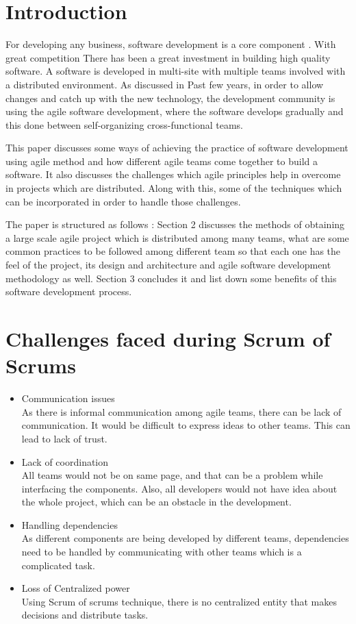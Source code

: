 \documentclass[sigconf]{acmart}
\begin{document}
\section{Introduction}
For developing any business, software development is a core component \cite{HenrikK}. With great competition There has been a great investment in building high quality software. A software is developed in multi-site with multiple teams involved with a distributed environment. As discussed in \cite{4638656}Past few years, in order to allow changes and catch up with the new technology, the development community is using the agile software development, where the software develops gradually and this done between self-organizing cross-functional teams\cite{Moe:2014:NLD:2652524.2652584}. 

This paper discusses some ways of achieving the practice of software development using agile method and how different agile teams come together to build a software\cite{SunitP}. It also discusses the challenges which agile principles help in overcome in projects which are distributed. Along with this, some of the techniques which can be incorporated in order to handle those challenges.

The paper is structured as follows : Section 2 discusses the methods of obtaining a large scale agile project which is distributed among many teams, what are some common practices to be followed among different team so that each one has the feel of the project, its design and architecture\cite{de2010conducting} and agile software development methodology as well. Section 3 concludes it and list down some benefits of this software development process.

\section{Challenges faced during Scrum of Scrums}
\begin{itemize}
\item Communication issues
\\As there is informal communication among agile teams, there can be lack of communication. It would be difficult to express ideas to other teams. This can lead to lack of trust.

\item Lack of coordination
\\All teams would not be on same page, and that can be a problem while interfacing the components. Also, all developers would not have idea about the whole project, which can be an obstacle in the development. 

\item Handling dependencies
\\As different components are being developed by different teams, dependencies need to be handled by communicating with other teams which is a complicated task. 

\item Loss of Centralized power
\\Using Scrum of scrums technique, there is no centralized entity that makes decisions and distribute tasks.
\end{itemize}
\end{document}
